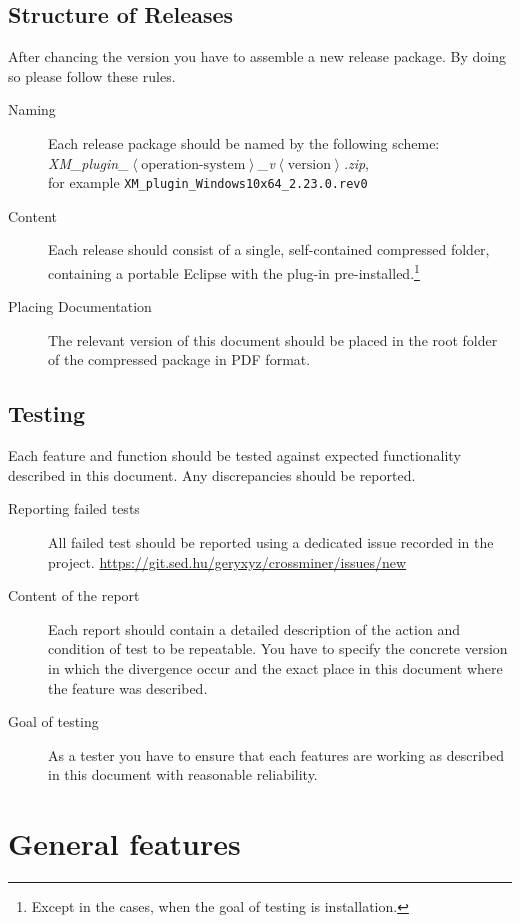 \documentclass[11pt,a4paper]{book}
\newcommand{\placeholder}[1]{$\left\langle\text{#1}\right\rangle$}
\begin{document}
\section{Structure of Releases}

After chancing the version you have to assemble a new release package. By doing so please follow these rules.

\begin{description}
	\item[Naming] Each release package should be named by the following scheme: \emph{XM\_plugin\_\placeholder{operation-system}\_v\placeholder{version}.zip},\\for example \texttt{XM\_plugin\_Windows10x64\_2.23.0.rev0}
	\item[Content] Each release should consist of a single, self-contained compressed folder, containing a portable Eclipse with the plug-in pre-installed.\footnote{Except in the cases, when the goal of testing is installation.}
	\item[Placing Documentation] The relevant version of this document should be placed in the root folder of the compressed package in PDF format.
\end{description}

\section{Testing}

Each feature and function should be tested against expected functionality described in this document. Any discrepancies should be reported.

\begin{description}
	\item[Reporting failed tests] All failed test should be reported using a dedicated issue recorded in the project. \url{https://git.sed.hu/geryxyz/crossminer/issues/new}
	\item[Content of the report] Each report should contain a detailed description of the action and condition of test to be repeatable. You have to specify the concrete version in which the divergence occur and the exact place in this document where the feature was described.
	\item[Goal of testing] As a tester you have to ensure that each features are working as described in this document with reasonable reliability.
\end{description}

\chapter{General features}
\end{document}
